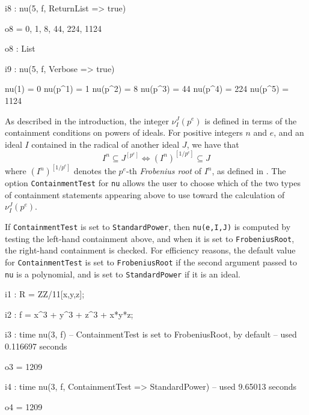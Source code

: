 \documentclass{amsart}
\begin{document}
\medspace
{\small
{}
\begin{MyVerbatim}

i8 : nu(5, f, ReturnList => true)

o8 = {0, 1, 8, 44, 224, 1124}

o8 : List

i9 : nu(5, f, Verbose => true)

     nu(1) = 0
     nu(p^1) = 1
     nu(p^2) = 8
     nu(p^3) = 44
     nu(p^4) = 224
     nu(p^5) = 1124
\end{MyVerbatim}
}
\medspace


As described in the introduction, the integer $\nu_I^J(p^e)$ is defined in terms of the containment conditions on powers of ideals.
For positive integers $n$ and $e$, and an ideal $I$ contained in the radical of another ideal $J$, we have that
\begin{equation*}
  I^n \subseteq J^{[p^e]} \Longleftrightarrow (I^n)^{[1/p^e]} \subseteq J
\end{equation*}
where $(I^n)^{[1/p^e]}$ denotes the $p^e$-th \emph{Frobenius root} of $I^n$, as defined in \cite{BlickleMustataSmithDiscretenessAndRationalityOfFThresholds}.
The option {\tt ContainmentTest} for {\tt nu} allows the user to choose which of the two types of containment statements appearing above to use toward the calculation of $\nu_I^J(p^e)$.

If {\tt ContainmentTest} is set to {\tt StandardPower}, then {\tt nu(e,I,J)} is computed by testing the left-hand containment above, and when it is set to {\tt FrobeniusRoot}, the right-hand containment is checked.
For efficiency reasons, the default value for {\tt ContainmentTest} is set to  {\tt FrobeniusRoot} if the second argument passed to {\tt nu} is a polynomial, and is set to {\tt StandardPower} if it is an ideal.

\medspace
{\small
{}
\begin{MyVerbatim}

i1 : R = ZZ/11[x,y,z];

i2 : f = x^3 + y^3 + z^3 + x*y*z;

i3 : time nu(3, f) -- ContainmentTest is set to FrobeniusRoot, by default
     -- used 0.116697 seconds

o3 = 1209

i4 : time nu(3, f, ContainmentTest => StandardPower)
     -- used 9.65013 seconds

o4 = 1209
\end{MyVerbatim}
}
\medspace
\end{document}
